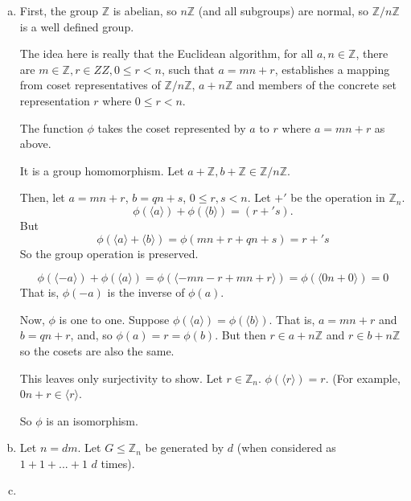 \documentclass[11pt,oneside]{article}
\numberwithin{equation}{section}
\theoremstyle{definition}
\def\ZZ{\mathbb{Z}}
\begin{document}
\begin{solution}
  \begin{enumerate}[(a)]
  \item
    First, the group $\ZZ$ is abelian, so $n\ZZ$ (and all subgroups)
    are normal, so $\ZZ / n\ZZ$ is a well defined group.  
    
    The idea here is really that the Euclidean algorithm, for all $a,
    n \in \ZZ$, there are $m \in \ZZ, r \in ZZ, 0 \leq r < n$, such
    that $ a = m n + r$, establishes a mapping from coset representatives of $ \ZZ / n\ZZ$,
    $a + n\ZZ$ and members of the concrete set representation $ r$ where $ 0 \leq r < n$.  
    
    The function $\phi$ takes the coset represented by $a$ to $r$ where $a = mn +r$ as above. 

    It is a group homomorphism.  Let $a + \ZZ, b + \ZZ \in \ZZ / n\ZZ$.

\def\pmod{+'}
    Then, let $ a = mn + r$, $b = qn + s$, $ 0 \leq r, s < n$.  Let $\pmod$ be the operation in $\ZZ_n$. 
    $$
    \phi (\langle a \rangle) + \phi(\langle b \rangle) = (r \pmod s). 
    $$
    But
    $$ \phi(\langle a \rangle + \langle b \rangle ) = \phi (mn + r + qn + s) = r \pmod s
    $$
    So the group operation is preserved. 

    $$ \phi (\langle -a \rangle) + \phi (\langle a \rangle ) = \phi (\langle -mn - r + mn + r \rangle) = \phi(\langle 0n + 0 \rangle ) = 0
    $$
    That is, $\phi(-a)$ is the inverse of $\phi(a)$.

    Now, $\phi$ is one to one. Suppose $\phi(\langle a \rangle ) =
    \phi(\langle b \rangle )$.  That is, $a = mn +r$ and $b = qn + r$,
    and, so $\phi(a) = r = \phi(b)$. But then $r \in a + n\ZZ $ and $
    r \in b + n \ZZ$ so the cosets are also the same.

    This leaves only surjectivity to show.  Let $r \in \ZZ_n$.  $\phi(\langle r \rangle) = r$.  (For example,
    $0 n + r \in \langle r \rangle$.

    So $\phi$ is an isomorphism.  
    
  \item
    Let $n = d m$.  Let $G \leq \ZZ_n$ be generated by $d$ (when considered as
    $1 + 1 + ... + 1$ $d$ times).
  \item
    
  \end{enumerate}
\end{solution}
\end{document}
